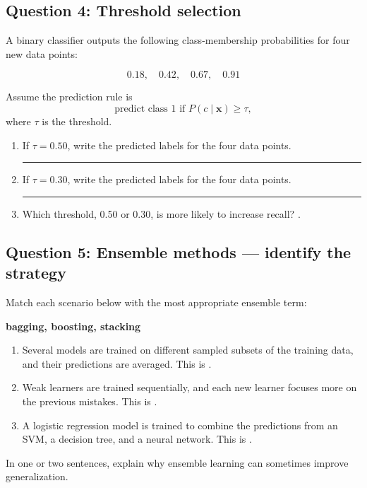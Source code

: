 \documentclass[12pt]{article}
\begin{document}
\subsection*{Question 4: Threshold selection}
A binary classifier outputs the following class-membership probabilities for four new data points:

\[
0.18,\quad 0.42,\quad 0.67,\quad 0.91
\]

Assume the prediction rule is
\[
\text{predict class }1 \text{ if } P(c\mid \bm{x}) \ge \tau,
\]
where \(\tau\) is the threshold.

\begin{enumerate}[label=(\alph*)]
    \item If \(\tau = 0.50\), write the predicted labels for the four data points.\\
    \rule{3in}{0.15mm}
    \item If \(\tau = 0.30\), write the predicted labels for the four data points.\\
    \rule{3in}{0.15mm}
    \item Which threshold, 0.50 or 0.30, is more likely to increase recall? \underline{\hspace{1.5cm}}.
\end{enumerate}

\subsection*{Question 5: Ensemble methods --- identify the strategy}
Match each scenario below with the most appropriate ensemble term:

\begin{center}
\textbf{bagging, boosting, stacking}
\end{center}

\begin{enumerate}[label=(\alph*)]
    \item Several models are trained on different sampled subsets of the training data, and their predictions are averaged. This is \underline{\hspace{3cm}}.
    \item Weak learners are trained sequentially, and each new learner focuses more on the previous mistakes. This is \underline{\hspace{3cm}}.
    \item A logistic regression model is trained to combine the predictions from an SVM, a decision tree, and a neural network. This is \underline{\hspace{3cm}}.
\end{enumerate}

\bigskip

In one or two sentences, explain why ensemble learning can sometimes improve generalization.\\

\vspace{20pt}
\fullunderline

\vspace{20pt}
\fullunderline
\end{document}
